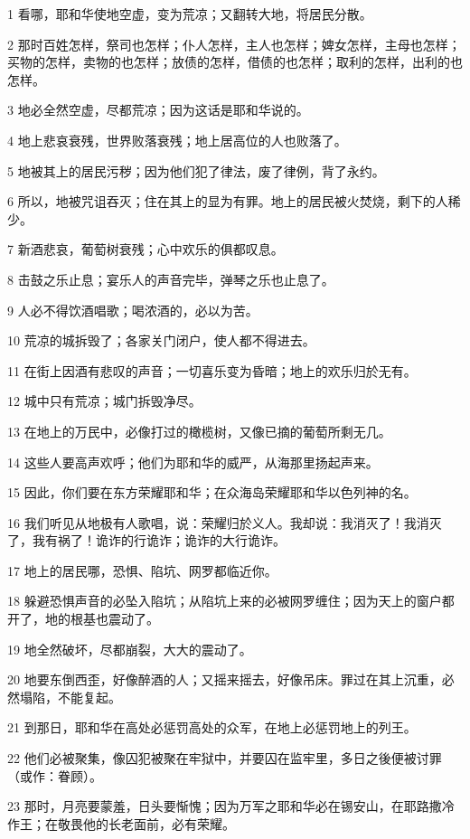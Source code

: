 \par 1 看哪，耶和华使地空虚，变为荒凉；又翻转大地，将居民分散。
\par 2 那时百姓怎样，祭司也怎样；仆人怎样，主人也怎样；婢女怎样，主母也怎样；买物的怎样，卖物的也怎样；放债的怎样，借债的也怎样；取利的怎样，出利的也怎样。
\par 3 地必全然空虚，尽都荒凉；因为这话是耶和华说的。
\par 4 地上悲哀衰残，世界败落衰残；地上居高位的人也败落了。
\par 5 地被其上的居民污秽；因为他们犯了律法，废了律例，背了永约。
\par 6 所以，地被咒诅吞灭；住在其上的显为有罪。地上的居民被火焚烧，剩下的人稀少。
\par 7 新酒悲哀，葡萄树衰残；心中欢乐的俱都叹息。
\par 8 击鼓之乐止息；宴乐人的声音完毕，弹琴之乐也止息了。
\par 9 人必不得饮酒唱歌；喝浓酒的，必以为苦。
\par 10 荒凉的城拆毁了；各家关门闭户，使人都不得进去。
\par 11 在街上因酒有悲叹的声音；一切喜乐变为昏暗；地上的欢乐归於无有。
\par 12 城中只有荒凉；城门拆毁净尽。
\par 13 在地上的万民中，必像打过的橄榄树，又像已摘的葡萄所剩无几。
\par 14 这些人要高声欢呼；他们为耶和华的威严，从海那里扬起声来。
\par 15 因此，你们要在东方荣耀耶和华；在众海岛荣耀耶和华以色列神的名。
\par 16 我们听见从地极有人歌唱，说：荣耀归於义人。我却说：我消灭了！我消灭了，我有祸了！诡诈的行诡诈；诡诈的大行诡诈。
\par 17 地上的居民哪，恐惧、陷坑、网罗都临近你。
\par 18 躲避恐惧声音的必坠入陷坑；从陷坑上来的必被网罗缠住；因为天上的窗户都开了，地的根基也震动了。
\par 19 地全然破坏，尽都崩裂，大大的震动了。
\par 20 地要东倒西歪，好像醉酒的人；又摇来摇去，好像吊床。罪过在其上沉重，必然塌陷，不能复起。
\par 21 到那日，耶和华在高处必惩罚高处的众军，在地上必惩罚地上的列王。
\par 22 他们必被聚集，像囚犯被聚在牢狱中，并要囚在监牢里，多日之後便被讨罪（或作：眷顾）。
\par 23 那时，月亮要蒙羞，日头要惭愧；因为万军之耶和华必在锡安山，在耶路撒冷作王；在敬畏他的长老面前，必有荣耀。

